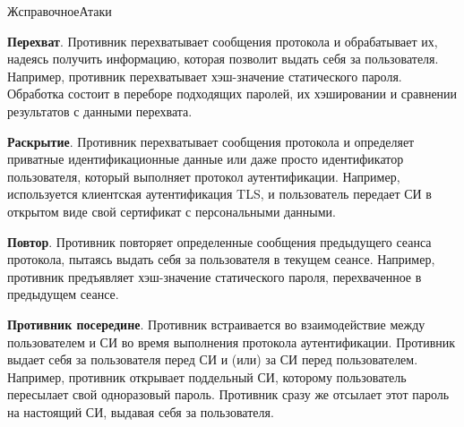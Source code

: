 \begin{appendix}{Ж}{справочное}{Атаки}

{\bf Перехват}. 
Противник перехватывает сообщения протокола и обрабатывает их,
надеясь получить информацию, которая позволит выдать себя за пользователя. 
Например, противник перехватывает хэш-значение статического пароля.
Обработка состоит в переборе подходящих паролей, их хэшировании и 
сравнении результатов с данными перехвата. 


{\bf Раскрытие}. 
Противник перехватывает сообщения протокола и 
определяет приватные идентификационные данные или даже просто 
идентификатор пользователя, который выполняет протокол аутентификации.
% 
Например, используется клиентская аутентификация TLS, 
и пользователь передает СИ в открытом виде
свой сертификат с персональными данными.


{\bf Повтор}. 
Противник повторяет определенные сообщения предыдущего сеанса протокола,
пытаясь выдать себя за пользователя в текущем сеансе. 
%
Например, противник предъявляет хэш-значение статического пароля,
перехваченное в предыдущем сеансе.


{\bf Противник посередине}. 
Противник встраивается во взаимодействие между пользователем и СИ во время
выполнения протокола аутентификации. Противник выдает себя 
за пользователя перед СИ и (или) за СИ перед пользователем. 
Например, противник открывает поддельный СИ, которому пользователь 
пересылает свой одноразовый пароль. Противник сразу же отсылает
этот пароль на настоящий СИ, выдавая себя за пользователя.



\end{appendix}
